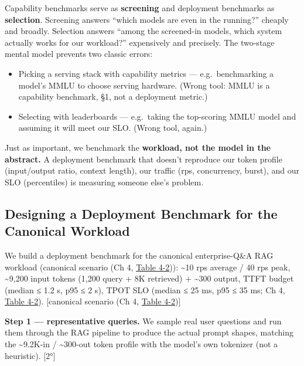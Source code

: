 \label{mental-model}


Capability benchmarks serve as \textbf{screening} and deployment
benchmarks as \textbf{selection}. Screening answers ``which models are
even in the running?'' cheaply and broadly. Selection answers ``among
the screened-in models, which system actually works for our workload?''
expensively and precisely. The two-stage mental model prevents two
classic errors:

\begin{itemize}
\tightlist
\item
  Picking a serving stack with capability metrics --- e.g.~benchmarking
  a model's MMLU to choose serving hardware. (Wrong tool: MMLU is a
  capability benchmark, §1, not a deployment metric.)
\item
  Selecting with leaderboards --- e.g.~taking the top-scoring MMLU model
  and assuming it will meet our SLO. (Wrong tool, again.)
\end{itemize}

Just as important, we benchmark the \textbf{workload, not the model in
the abstract.} A deployment benchmark that doesn't reproduce our token
profile (input/output ratio, context length), our traffic (rps,
concurrency, burst), and our SLO (percentiles) is measuring someone
else's problem.

\label{worked-example}


\subsection{Designing a Deployment Benchmark for the Canonical
Workload}\label{designing-a-deployment-benchmark-for-the-canonical-workload}

We build a deployment benchmark for the canonical enterprise-Q\&A RAG
workload (canonical scenario (Ch 4, \hyperref[tab:4.2]{Table 4-2})): \textasciitilde10 rps
average / 40 rps peak, \textasciitilde9,200 input tokens (1,200 query +
8K retrieved) + \textasciitilde300 output, TTFT budget (median ≤ 1.2 s,
p95 ≤ 2 s), TPOT SLO (median ≤ 25 ms, p95 ≤ 35 ms; Ch 4, \hyperref[tab:4.2]{Table 4-2}).
{[}canonical scenario (Ch 4, \hyperref[tab:4.2]{Table 4-2}){]}

\textbf{Step 1 --- representative queries.} We sample real user
questions and run them through the RAG pipeline to produce the actual
prompt shapes, matching the \textasciitilde9.2K-in /
\textasciitilde300-out token profile with the model's own tokenizer (not
a heuristic). \mbox{{[}2°{]}}

